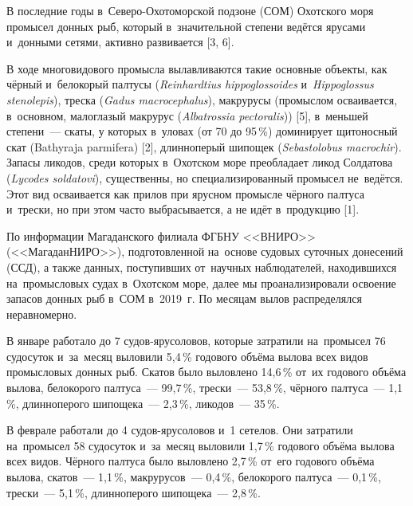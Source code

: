 



\makeProcTitleIV
{}



В последние годы в~Северо-Охотоморской подзоне (СОМ) Охотского моря промысел донных рыб, который в~значительной степени ведётся ярусами и~донными сетями, активно развивается [3, 6].

В ходе многовидового промысла вылавливаются такие основные объекты, как чёрный и~белокорый палтусы (\textit{Reinhardtius hippoglossoides} и~\textit{Hip\-po\-glos\-sus stenolepis}), треска (\textit{Gadus macrocephalus}), макрурусы (промыслом осваивается, в~основном, малоглазый макрурус (\textit{Albatrossia pectoralis})) [5], в~меньшей степени~--- скаты, у которых в~уловах (от 70 до 95\,\%) доминирует щитоносный скат (Bathyraja parmifera) [2], длинноперый шипощек (\textit{Sebastolobus macrochir}). Запасы ликодов, среди которых в~Охотском море преобладает ликод Солдатова (\textit{Lycodes soldatovi}), существенны, но специализированный промысел не~ведётся. Этот вид осваивается как прилов при ярусном промысле чёрного палтуса и~трески, но при этом часто выбрасывается, а не идёт в~продукцию [1].

По информации Магаданского филиала ФГБНУ <<ВНИРО>> (<<МагаданНИРО>>), подготовленной на~основе судовых суточных донесений (ССД), а также данных, поступивших от~научных наблюдателей, находившихся на~промысловых судах в~Охотском море, далее мы проанализировали освоение запасов донных рыб в~СОМ в~2019~г. По месяцам вылов распределялся неравномерно.

В январе работало до 7 судов-ярусоловов, которые затратили на~промысел 76 судосуток и~за~месяц выловили 5,4\,\% годового объёма вылова всех видов промысловых донных рыб. Скатов было выловлено 14,6\,\% от~их годового объёма вылова, белокорого палтуса~--- 99,7\,\%, трески~--- 53,8\,\%, чёрного палтуса~--- 1,1\,\%, длинноперого шипощека~--- 2,3\,\%, ликодов~--- 35\,\%.

В феврале работали до 4 судов-ярусоловов и~1 сетелов. Они затратили на~промысел 58 судосуток и~за~месяц выловили 1,7\,\% годового объёма вылова всех видов. Чёрного палтуса было выловлено 2,7\,\% от~его годового объёма вылова, скатов~--- 1,1\,\%, макрурусов~--- 0,4\,\%, белокорого палтуса~--- 0,1\,\%, трески~--- 5,1\,\%, длинноперого шипощека~--- 2,8\,\%.

